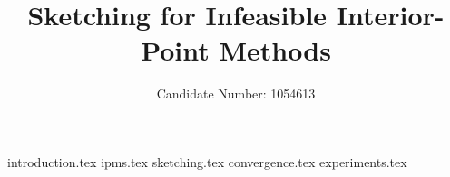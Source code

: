 \documentclass[a4paper, 12pt, oneside, egregdoesnotlikesansseriftitles]{scrbook}
\author{Candidate Number: 1054613}
\title{Sketching for Infeasible Interior-Point Methods}
\begin{document}
\hypersetup{pageanchor=false}
\maketitle
\hypersetup{pageanchor=true}

\frontmatter{}
\tableofcontents

\mainmatter{}
{introduction.tex}
{ipms.tex}
{sketching.tex}
{convergence.tex}
{experiments.tex}

\backmatter{}
\printbibliography[heading=bibintoc]
\end{document}
